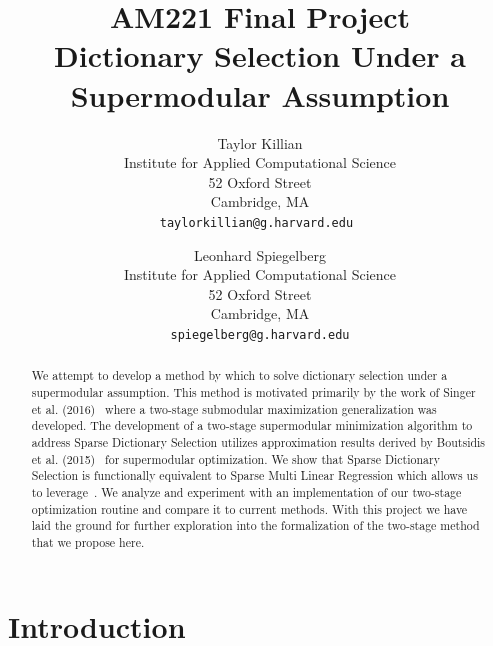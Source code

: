 \documentclass{article}
\makeatletter
\newcommand*{\toccontents}{\@starttoc{toc}}
\makeatother
\begin{document}
\title{\Huge AM221 Final Project \\ \Large Dictionary Selection Under a Supermodular Assumption}
\singlespacing
\author{
  Taylor Killian\\
           \small Institute for Applied Computational Science\\
	\small 52 Oxford Street\\
	\small Cambridge, MA\\
  \texttt{taylorkillian@g.harvard.edu }
  \and
  Leonhard Spiegelberg\\
         \small Institute for Applied Computational Science\\
	\small 52 Oxford Street\\
	\small Cambridge, MA\\
 \texttt{spiegelberg@g.harvard.edu}
}
\maketitle
\doublespacing
\begin{abstract}
We attempt to develop a method by which to solve dictionary selection under a supermodular assumption. This method is motivated primarily by the work of Singer et al. (2016)~\cite{Singer16TwoStage} where a two-stage submodular maximization generalization was developed. The development of a two-stage supermodular minimization algorithm to address Sparse Dictionary Selection utilizes approximation results derived by Boutsidis et al. (2015)~\cite{weaklyalpha} for supermodular optimization. We show that Sparse Dictionary Selection is functionally equivalent to Sparse Multi Linear Regression which allows us to leverage~\cite{weaklyalpha}. We analyze and experiment with an implementation of our two-stage optimization routine and compare it to current methods. With this project we have laid the ground for further exploration into the formalization of the two-stage method that we propose here.
\end{abstract}

\vfill
\singlespacing
\begin{center}
\bfseries\contentsname
\end{center}
\toccontents
\clearpage

\doublespacing
\section{Introduction}\label{sec:intro}
\end{document}
